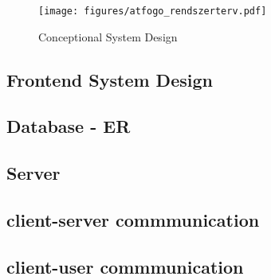 \begin{figure}[!ht]
	\texttt{[image: figures/atfogo\_rendszerterv.pdf]}
	\caption{Conceptional System Design}
	\label{fig:conceptional-system-design}
\end{figure}


\subsection{Frontend System Design}

\subsection{Database - ER}

\subsection{Server}

\subsection{client-server commmunication}

\subsection{client-user commmunication}
